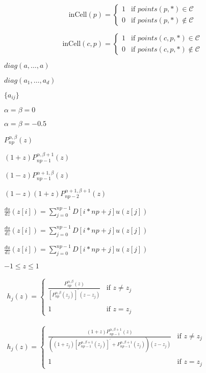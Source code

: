 \documentclass{article}
\begin{document}
\[
        \mbox{inCell}(p) = 
          \left\{\begin{array}{rl} 
             1 & \mbox{if $points(p,*)\in {\mathcal{C}}$} \\ [2ex]
             0 & \mbox{if $points(p,*)\notin {\mathcal{C}}$} 
          \end{array}\right.
\]
\pagebreak

\[
        \mbox{inCell}(c,p) = 
          \left\{\begin{array}{rl} 
              1 & \mbox{if $points(c,p,*)\in {\mathcal{C}}$} \\ [2ex]
              0 & \mbox{if $points(c,p,*)\notin {\mathcal{C}}$} 
        \end{array}\right.
\]
\pagebreak

$ diag(a,\ldots,a) $
\pagebreak

$ diag(a_1,\ldots,a_d) $
\pagebreak

$ \{a_{ij}\}$
\pagebreak

$ \alpha = \beta = 0 $
\pagebreak

$ \alpha = \beta = -0.5 $
\pagebreak

$ P^{\alpha,\beta}_{np}(z)$
\pagebreak

$(1+z) P^{\alpha,\beta+1}_{np-1}(z)$
\pagebreak

$(1-z) P^{\alpha+1,\beta}_{np-1}(z)$
\pagebreak

$ (1-z)(1+z) P^{\alpha+1,\beta+1}_{np-2}(z) $
\pagebreak

$  \frac{du}{dz}(z[i]) =  \sum_{j=0}^{np-1} D[i*np+j] u(z[j]) $
\pagebreak

$ \frac{du}{dz}(z[i]) =
    \sum_{j=0}^{np-1} D[i*np+j] u(z[j]) $
\pagebreak

$
    \frac{du}{dz}(z[i]) = \sum_{j=0}^{np-1} D[i*np+j] u(z[j]) $
\pagebreak

$ -1 \leq z \leq 1 $
\pagebreak

$
    \begin{array}{rcl}
    h_j(z) =  \left\{ \begin{array}{ll}
    \displaystyle \frac{P_{np}^{\alpha,\beta}(z)}
    {[P_{np}^{\alpha,\beta}(z_j)]^\prime
    (z-z_j)} & \mbox{if $z \ne z_j$}\\
    & \\
    1 & \mbox{if $z=z_j$}
    \end{array}
    \right.
    \end{array}
    $
\pagebreak

$ \begin{array}{rcl}
h_j(z) = \left\{ \begin{array}{ll}
\displaystyle \frac{(1+z) P_{np-1}^{\alpha,\beta+1}(z)}
{((1+z_j) [P_{np-1}^{\alpha,\beta+1}(z_j)]^\prime +
P_{np-1}^{\alpha,\beta+1}(z_j) ) (z-z_j)} & \mbox{if $z \ne z_j$}\\
& \\
1 & \mbox{if $z=z_j$}
\end{array}
\right.
\end{array}   $
\pagebreak
\end{document}
